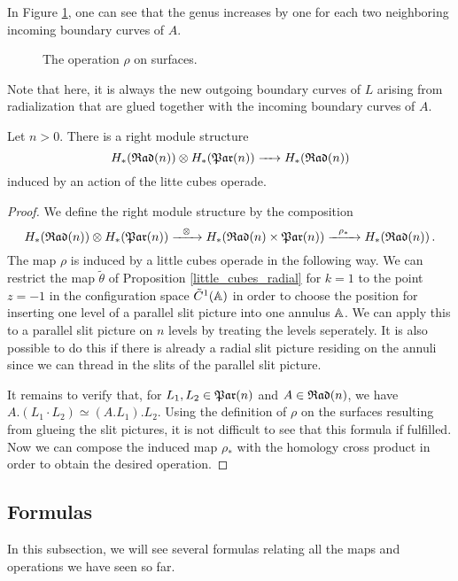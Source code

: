 In Figure \ref{rad_is_par_module}, one can see that the genus increases by one for each two neighboring incoming boundary curves of $A$.
\begin{figure}[ht]
\centering
\def\svgwidth{\columnwidth}

\caption{\label{rad_is_par_module} The operation $\rho$ on surfaces.}
\end{figure}
Note that here, it is always the new outgoing boundary curves of $L$ arising from radialization that are glued together with the incoming boundary curves of $A$.

\begin{prop}
   Let $n > 0$.
   There is a right module structure 
   \[
      H_*(\mathfrak{Rad}(n)) \otimes H_*(\mathfrak{Par}(n)) \xrightarrow{\hspace{6pt}{}\hspace{6pt}} H_*(\mathfrak{Rad}(n))
   \]
   induced by an action of the litte cubes operade.
\begin{proof}
   We define the right module structure by the composition
   \[
      H_*(\mathfrak{Rad}(n)) \otimes H_*(\mathfrak{Par}(n)) \xrightarrow{\hspace{6pt}{\otimes}\hspace{6pt}} H_*(\mathfrak{Rad}(n) \times \mathfrak{Par}(n)) \xrightarrow{\hspace{6pt}{\rho_*}\hspace{6pt}} H_*(\mathfrak{Rad}(n))\,.
   \]
   The map $\rho$ is induced by a little cubes operade in the following way.
   We can restrict the map $\tilde \theta$ of Proposition \ref{little_cubes_radial} for $k = 1$ to the point $z = -1$ in the configuration space $\tilde C^1(\mathbb A)$ in order to choose
   the position for inserting one level of a parallel slit picture into one annulus $\mathbb A$.
   We can apply this to a parallel slit picture on $n$ levels by treating the levels seperately.
   It is also possible to do this if there is already a radial slit picture residing on the annuli since we can thread in the slits of the parallel slit picture.
   
   It remains to verify that, for $L_1, L_2 \in \mathfrak{Par}(n)$ and $A \in \mathfrak{Rad}(n)$, we have $A.(L_1 \cdot L_2) \simeq (A.L_1).L_2$.
   Using the definition of $\rho$ on the surfaces resulting from glueing the slit pictures, it is not difficult to see that this formula if fulfilled.
   Now we can compose the induced map $\rho_*$ with the homology cross product in order to obtain the desired operation.
\end{proof}
\end{prop}

\subsection{Formulas}

In this subsection, we will see several formulas relating all the maps and operations we have seen so far.

